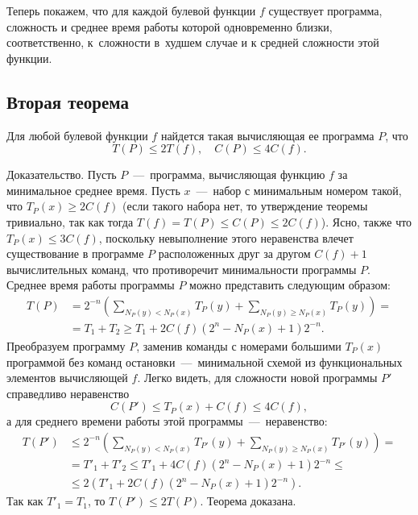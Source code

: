 \documentclass[12pt]{article}
\numberwithin{equation}{section}
\begin{document}
Теперь покажем, что для каждой булевой функции $f$ существует программа, сложность и среднее время работы которой одновременно близки, соответственно, к~сложности в~худшем случае и к средней сложности этой функции.
\subsection{Вторая теорема}
\newtheorem{The}{Теорема}
\begin{Th} Для любой булевой функции
$f$ найдется такая вычисляющая ее программа $P$, что
$$T(P)\le 2T(f), \quad C(P)\le 4C(f).$$ 
\end{Th}

{\sc Доказательство.} Пусть
$P$~---~программа, вычисляющая функцию $f$ за
минимальное среднее время. Пусть $x$~---~набор с минимальным номером такой, что $T_P(x) \ge 2C(f)$ (если такого набора нет, то утверждение теоремы
тривиально, так как тогда $T(f)=T(P)\le C(P) \le 2C(f)$). Ясно, также что $T_P(x) \le 3C(f)$, поскольку невыполнение этого неравенства влечет существование в программе $P$ расположенных друг за другом $C(f)+1$ вычислительных команд, что противоречит минимальности программы $P$. Среднее
время работы программы $P$ можно представить следующим образом:
\begin{equation*}
\begin{split}
 T(P)&= 2^{-n} \left( \sum_{N_P(y)<N_P(x)}T_P(y)+ \sum_{N_P(y)\ge N_P(x)}T_P(y) \right)=\\ & = T_1+T_2\ge T_1+2C(f)(2^n-N_P(x)+1)2^{-n} .
\end{split}
\end{equation*}
Преобразуем программу $P$, заменив команды с номерами большими $T_P(x)$ программой без команд остановки~---~минимальной схемой из функциональных элементов вычисляющей $f$. Легко видеть, для сложности новой программы $P'$ справедливо неравенство
$$ C(P')\le T_P(x)+C(f)\le 4C(f), $$
а для среднего времени работы этой программы~---~неравенство:
\begin{equation*}{\begin{split}
 T(P')&\le 2^{-n} \left( \sum_{N_P(y)<N_P(x)}T_{P'}(y)+ \sum_{N_P(y)\ge N_P(x)}T_{P'}(y) \right)=\\ & = T'_1+T'_2\le T'_1+4C(f)(2^n-N_P(x)+1)2^{-n} \le \\ & \le
 2(T'_1+2C(f)(2^n-N_P(x)+1)2^{-n}).
\end{split}}
\end{equation*}
Так как $T'_1=T_1$, то $T(P')\le 2T(P)$. Теорема доказана.
\end{document}
